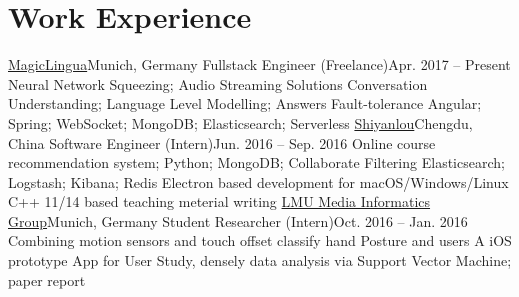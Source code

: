 \section{\textbf{Work Experience}}
  \resumeSubHeadingListStart
    \resumeSubheading
    {\href{https://magiclingua.com/}{MagicLingua}}{Munich, Germany}
    {Fullstack Engineer (Freelance)}{Apr. 2017 -- Present}
    \resumeItemListStart
        {Neural Network Squeezing; Audio Streaming Solutions}
        {Conversation Understanding; Language Level Modelling; Answers Fault-tolerance}
        {Angular; Spring; WebSocket; MongoDB; Elasticsearch; Serverless}
    \resumeItemListEnd
    \resumeSubheading
      {\href{https://shiyanlou.com/}{Shiyanlou}}{Chengdu, China}
      {Software Engineer (Intern)}{Jun. 2016 -- Sep. 2016}
      \resumeItemListStart
          {Online course recommendation system; Python; MongoDB; Collaborate Filtering}
          {Elasticsearch; Logstash; Kibana; Redis}
          {Electron based development for macOS/Windows/Linux}
          {C++ 11/14 based teaching meterial writing}
      \resumeItemListEnd
    \resumeSubheading
      {\href{http://www.medien.ifi.lmu.de}{LMU Media Informatics Group}}{Munich, Germany}
      {Student Researcher (Intern)}{Oct. 2016 -- Jan. 2016}
      \resumeItemListStart
          {Combining motion sensors and touch offset classify hand Posture and users}
          {A iOS prototype App for User Study, densely data analysis via Support Vector Machine; paper report}
      \resumeItemListEnd
  \resumeSubHeadingListEnd